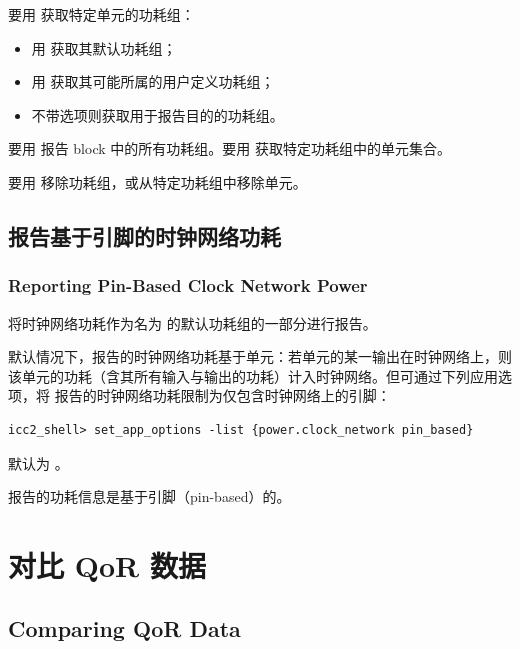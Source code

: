要用  获取特定单元的功耗组：
\begin{itemize}
  \item 用  获取其默认功耗组；
  \item 用  获取其可能所属的用户定义功耗组；
  \item 不带选项则获取用于报告目的的功耗组。
\end{itemize}

要用  报告 block 中的所有功耗组。要用  获取特定功耗组中的单元集合。

要用  移除功耗组，或从特定功耗组中移除单元。

\subsection{报告基于引脚的时钟网络功耗}
\subsubsection*{Reporting Pin-Based Clock Network Power}

 将时钟网络功耗作为名为  的默认功耗组的一部分进行报告。

默认情况下，报告的时钟网络功耗基于单元：若单元的某一输出在时钟网络上，则该单元的功耗（含其所有输入与输出的功耗）计入时钟网络。但可通过下列应用选项，将  报告的时钟网络功耗限制为仅包含时钟网络上的引脚：
\begin{lstlisting}
icc2_shell> set_app_options -list {power.clock_network pin_based}
\end{lstlisting}

默认为 。

 报告的功耗信息是基于引脚（pin-based）的。

\section{对比 QoR 数据}
\subsection*{Comparing QoR Data}

